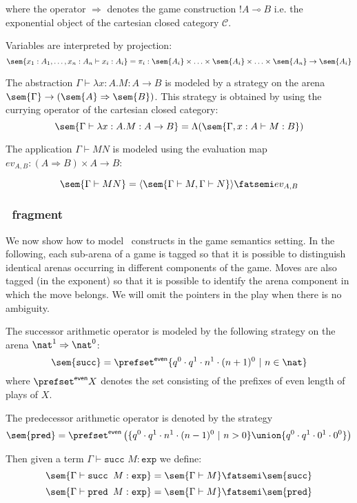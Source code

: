 where the operator $\Rightarrow$ denotes the game construction $!A
\multimap B$ i.e. the exponential object of the cartesian closed
category $\mathcal{C}$.



Variables are interpreted by projection:
$$\sem{x_1 : A_1, \ldots, x_n:A_n \vdash x_i : A_i} = \pi_i : \sem{A_i} \times \ldots \times \sem{A_i} \times \ldots \times \sem{A_n} \rightarrow  \sem{A_i}$$

The abstraction $\Gamma \vdash \lambda x :A.M : A \rightarrow B$ is
modeled by a strategy on the arena $\sem{\Gamma} \rightarrow
(\sem{A}\Rightarrow\sem{B})$. This strategy is obtained by using the
currying operator of the cartesian closed category:
$$\sem{\Gamma \vdash \lambda x :A.M : A \rightarrow B} = \Lambda( \sem{\Gamma, x :A \vdash M : B})$$

The application $\Gamma \vdash M N$ is modeled using the evaluation
map $ev_{A,B} : (A\Rightarrow B)\times A \rightarrow B$:

$$\sem{\Gamma \vdash M N} = \langle \sem{\Gamma \vdash M, \Gamma \vdash N} \rangle \fatsemi ev_{A,B}$$


\subsubsection{\pcf\ fragment}

We now show how to model \pcf\ constructs in the game semantics
setting. In the following, each sub-arena of a game is tagged so that it is possible to distinguish identical arenas
occurring in different components of the game. Moves are also tagged (in the exponent) so that it is possible
to identify the arena component in which the move belongs. We will
omit the pointers in the play when there is no ambiguity.

The successor arithmetic operator is modeled by the following
strategy on the arena $\nat^1 \Rightarrow \nat^0$:
$$\sem{\texttt{succ}} = \prefset^{\sf even} \{q^0 \cdot q^1 \cdot n^1 \cdot (n+1)^0\ |\ n \in \nat \}$$
where $\prefset^{\sf even} X$ denotes the set consisting of the prefixes of even length of plays of $X$.

The predecessor arithmetic operator is denoted by the strategy
$$\sem{\texttt{pred}} = \prefset^{\sf even} \left( \{q^0 \cdot q^1 \cdot n^1 \cdot (n-1)^0\ |\ n >0 \} \union \{ q^0 \cdot q^1 \cdot 0^1 \cdot 0^0 \} \right)$$

Then given a term $\Gamma \vdash \texttt{succ }M : \texttt{exp}$ we
define:
$$\sem{\Gamma \vdash \texttt{succ } M : \texttt{exp}} = \sem{\Gamma \vdash M} \fatsemi \sem{\texttt{succ}} $$
$$\sem{\Gamma \vdash \texttt{pred } M : \texttt{exp}} = \sem{\Gamma \vdash M} \fatsemi \sem{\texttt{pred}} $$


